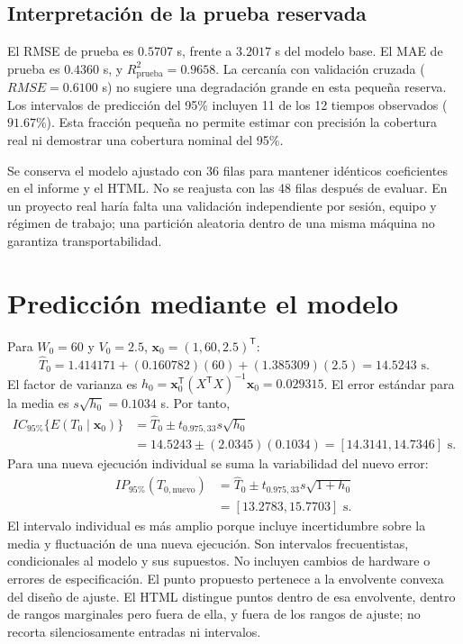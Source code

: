 \documentclass[11pt,a4paper]{article}
\begin{document}
\subsection{Interpretación de la prueba reservada}
El RMSE de prueba es $0.5707$ s, frente a $3.2017$ s del modelo base. El MAE de prueba es $0.4360$ s, y $R^2_{\mathrm{prueba}}=0.9658$. La cercanía con validación cruzada ($RMSE=0.6100$ s) no sugiere una degradación grande en esta pequeña reserva. Los intervalos de predicción del 95\% incluyen 11 de los 12 tiempos observados ($91.67\%$). Esta fracción pequeña no permite estimar con precisión la cobertura real ni demostrar una cobertura nominal del 95\%.

Se conserva el modelo ajustado con 36 filas para mantener idénticos coeficientes en el informe y el HTML. No se reajusta con las 48 filas después de evaluar. En un proyecto real haría falta una validación independiente por sesión, equipo y régimen de trabajo; una partición aleatoria dentro de una misma máquina no garantiza transportabilidad.

\section{Predicción mediante el modelo}
Para $W_0=60$ y $V_0=2.5$, $\boldsymbol x_0=(1,60,2.5)^{\mathsf T}$:
\[
\widehat T_0=1.414171+(0.160782)(60)+(1.385309)(2.5)=14.5243\text{ s}.
\]
El factor de varianza es $h_0=\boldsymbol x_0^{\mathsf T}(X^{\mathsf T}X)^{-1}\boldsymbol x_0=0.029315$. El error estándar para la media es $s\sqrt{h_0}=0.1034$ s. Por tanto,
\begin{align*}
IC_{95\%}\{E(T_0\mid\boldsymbol x_0)\}
&=\widehat T_0\pm t_{0.975,33}s\sqrt{h_0}\\
&=14.5243\pm(2.0345)(0.1034)=[14.3141,14.7346]\text{ s}.
\end{align*}
Para una nueva ejecución individual se suma la variabilidad del nuevo error:
\begin{align*}
IP_{95\%}(T_{0,\mathrm{nuevo}})
&=\widehat T_0\pm t_{0.975,33}s\sqrt{1+h_0}\\
&=[13.2783,15.7703]\text{ s}.
\end{align*}
El intervalo individual es más amplio porque incluye incertidumbre sobre la media y fluctuación de una nueva ejecución. Son intervalos frecuentistas, condicionales al modelo y sus supuestos. No incluyen cambios de hardware o errores de especificación. El punto propuesto pertenece a la envolvente convexa del diseño de ajuste. El HTML distingue puntos dentro de esa envolvente, dentro de rangos marginales pero fuera de ella, y fuera de los rangos de ajuste; no recorta silenciosamente entradas ni intervalos.
\end{document}
